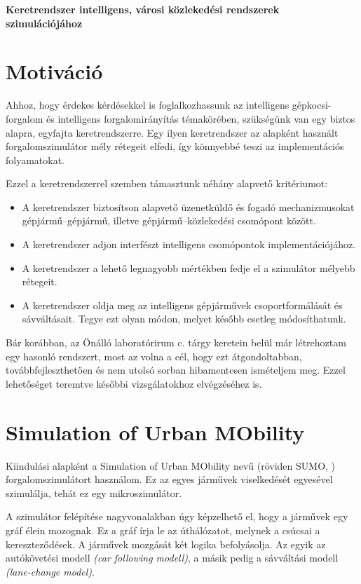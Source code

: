 \documentclass{article}
\begin{document}
	\centering
	\huge \textbf{Keretrendszer intelligens, városi közlekedési rendszerek szimulációjához}
	\normalfont \normalsize \justify
	\section{Motiváció}
		Ahhoz, hogy érdekes kérdésekkel is foglalkozhassunk az intelligens gépkocsi-forgalom és intelligens forgalomirányítás témakörében, szükségünk van egy biztos alapra, egyfajta keretrendszerre. Egy ilyen keretrendszer az alapként használt forgalomszimulátor mély rétegeit elfedi, így könnyebbé teszi az implementációs folyamatokat.
		
		Ezzel a keretrendszerrel szemben támasztunk néhány alapvető kritériumot:
		\begin{itemize}
			\item A keretrendszer biztosítson alapvető üzenetküldő és fogadó mechanizmusokat gépjármű--gépjármű, illetve gépjármű--közlekedési csomópont között.
			\item A keretrendszer adjon interfészt intelligens csomópontok implementációjához.
			\item A keretrendszer a lehető legnagyobb mértékben fedje el a szimulátor mélyebb rétegeit.
			\item A keretrendszer oldja meg az intelligens gépjárművek csoportformálását és sávváltásait. Tegye ezt olyan módon, melyet később esetleg módosíthatunk.
		\end{itemize}
	
		Bár korábban, az Önálló laboratórirum c. tárgy keretein belül már létrehoztam egy hasonló rendszert, most az volna a cél, hogy ezt átgondoltabban, továbbfejleszthetően és nem utolsó sorban hibamentesen ismételjem meg. Ezzel lehetőséget teremtve későbbi vizsgálatokhoz elvégzéséhez is.
		
	\section{Simulation of Urban MObility}
	
		Kiindulási alapként a Simulation of Urban MObility nevű (röviden SUMO, \cite{sumo}) forgalomszimulátort használom. Ez az egyes járművek viselkedését egyesével szimulálja, tehát ez egy mikroszimulátor.
		
		A szimulátor felépítése nagyvonalakban úgy képzelhető el, hogy a járművek egy gráf élein mozognak. Ez a gráf írja le az úthálózatot, melynek a csúcsai a kereszteződések. A járművek mozgását két logika befolyásolja. Az egyik az autókövetési modell \textit{(car following modell)}, a másik pedig a sávváltási modell \textit{(lane-change model)}.
		
\end{document}
